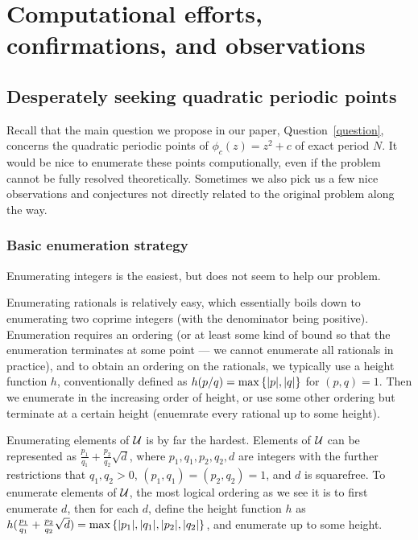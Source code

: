 \section{Computational efforts, confirmations, and observations}
\label{sec:comp}

\subsection{Desperately seeking quadratic periodic points}
\label{subsec:seek-quadratic}

Recall that the main question we propose in our paper,
Question~\ref{question}, concerns the quadratic periodic points of
$\phi_c(z) = z^2 + c$ of exact period $N$. It would be nice to
enumerate these points computionally, even if the problem cannot be
fully resolved theoretically. Sometimes we also pick us a few nice
observations and conjectures not directly related to the original
problem along the way.

\subsubsection{Basic enumeration strategy}
\label{sssec:enum}

Enumerating integers is the easiest, but does not seem to help our
problem.

Enumerating rationals is relatively easy, which essentially boils down
to enumerating two coprime integers (with the denominator being
positive). Enumeration requires an ordering (or at least some kind of
bound so that the enumeration terminates at some point --- we cannot
enumerate all rationals in practice), and to obtain an ordering on the
rationals, we typically use a height function $h$, conventionally
defined as $h(p/q) = \max\left\{|p|, |q|\right\}$ for $(p, q) = 1$. Then we
enumerate in the increasing order of height, or use some other
ordering but terminate at a certain height (enuemrate every rational
up to some height).

Enumerating elements of $\mathcal{U}$ is by far the hardest. Elements of $\mathcal{U}$
can be represented as $\frac{p_1}{q_1} + \frac{p_2}{q_2}\sqrt{d}$,
where $p_1, q_1, p_2, q_2, d$ are integers with the further
restrictions that $q_1, q_2 > 0$, $(p_1, q_1) = (p_2, q_2) = 1$, and
$d$ is squarefree. To enumerate elements of $\mathcal{U}$, the most logical
ordering as we see it is to first enumerate $d$, then for each $d$,
define the height function $h$ as $h(\frac{p_1}{q_1} +
\frac{p_2}{q_2}\sqrt{d}) = \max\left\{|p_1|, |q_1|, |p_2|, |q_2|\right\}$, and
enumerate up to some height.

